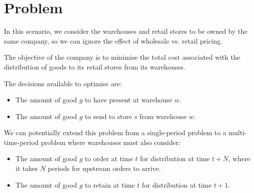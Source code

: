 \documentclass[a4paper,12pt]{article}
\begin{document}
\section{Problem}
In this scenario, we consider the warehouses and retail stores to be owned by the same company, so we can ignore the effect of wholesale vs. retail pricing.

The objective of the company is to minimise the total cost associated with the distribution of goods to its retail stores from its warehouses.

The decisions available to optimise are:
\begin{itemize}
    \item The amount of good $g$ to have present at warehouse $w$.
    \item The amount of good $g$ to send to store $s$ from warehouse $w$.
\end{itemize}

We can potentially extend this problem from a single-period problem to a multi-time-period problem where warehouses must also consider:
\begin{itemize}
    \item The amount of good $g$ to order at time $t$ for distribution at time $t+N$, where it takes $N$ periods for upstream orders to arrive.
    \item The amount of good $g$ to retain at time $t$ for distribution at time $t+1$.
\end{itemize}
\end{document}
